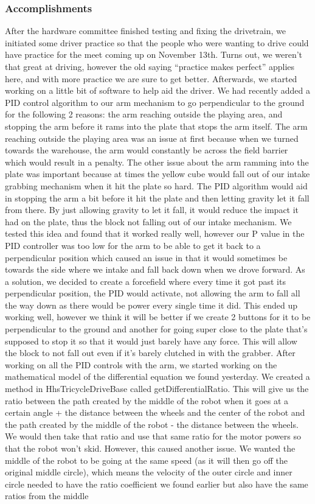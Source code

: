 \subsubsection*{Accomplishments}
After the hardware committee finished testing and fixing the drivetrain, we initiated some driver practice so that the people who were wanting to drive could have practice for the meet coming up on November 13th. Turns out, we weren’t that great at driving, however the old saying “practice makes perfect” applies here, and with more practice we are sure to get better. Afterwards, we started working on a little bit of software to help aid the driver. We had recently added a PID control algorithm to our arm mechanism to go perpendicular to the ground for the following 2 reasons: the arm reaching outside the playing area, and stopping the arm before it rams into the plate that stops the arm itself. The arm reaching outside the playing area was an issue at first because when we turned towards the warehouse, the arm would constantly be across the field barrier which would result in a penalty. The other issue about the arm ramming into the plate was important because at times the yellow cube would fall out of our intake grabbing mechanism when it hit the plate so hard. The PID algorithm would aid in stopping the arm a bit before it hit the plate and then letting gravity let it fall from there. By just allowing gravity to let it fall, it would reduce the impact it had on the plate, thus the block not falling out of our intake mechanism. We tested this idea and found that it worked really well, however our P value in the PID controller was too low for the arm to be able to get it back to a perpendicular position which caused an issue in that it would sometimes be towards the side where we intake and fall back down when we drove forward. As a solution, we decided to create a forcefield where every time it got past its perpendicular position, the PID would activate, not allowing the arm to fall all the way down as there would be power every single time it did. This ended up working well, however we think it will be better if we create 2 buttons for it to be perpendicular to the ground and another for going super close to the plate that’s supposed to stop it so that it would just barely have any force. This will allow the block to not fall out even if it's barely clutched in with the grabber. After working on all the PID controls with the arm, we started working on the mathematical model of the differential equation we found yesterday. We created a method in HhsTricycleDriveBase called getDifferentialRatio. This will give us the ratio between the path created by the middle of the robot when it goes at a certain angle + the distance between the wheels and the center of the robot and the path created by the middle of the robot - the distance between the wheels. We would then take that ratio and use that same ratio for the motor powers so that the robot won’t skid. However, this caused another issue. We wanted the middle of the robot to be going at the same speed (as it will then go off the original middle circle), which means the velocity of the outer circle and inner circle needed to have the ratio coefficient we found earlier but also have the same ratios from the middle 